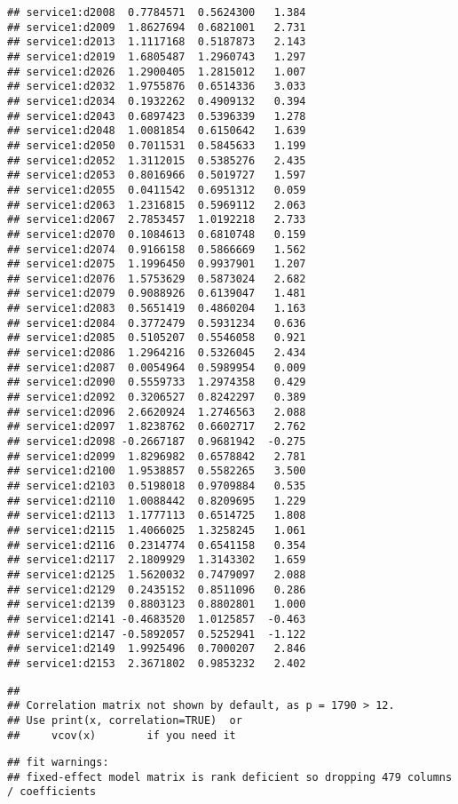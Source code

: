 \documentclass[
]{article}
\begin{document}
\begin{verbatim}
## service1:d2008  0.7784571  0.5624300   1.384
## service1:d2009  1.8627694  0.6821001   2.731
## service1:d2013  1.1117168  0.5187873   2.143
## service1:d2019  1.6805487  1.2960743   1.297
## service1:d2026  1.2900405  1.2815012   1.007
## service1:d2032  1.9755876  0.6514336   3.033
## service1:d2034  0.1932262  0.4909132   0.394
## service1:d2043  0.6897423  0.5396339   1.278
## service1:d2048  1.0081854  0.6150642   1.639
## service1:d2050  0.7011531  0.5845633   1.199
## service1:d2052  1.3112015  0.5385276   2.435
## service1:d2053  0.8016966  0.5019727   1.597
## service1:d2055  0.0411542  0.6951312   0.059
## service1:d2063  1.2316815  0.5969112   2.063
## service1:d2067  2.7853457  1.0192218   2.733
## service1:d2070  0.1084613  0.6810748   0.159
## service1:d2074  0.9166158  0.5866669   1.562
## service1:d2075  1.1996450  0.9937901   1.207
## service1:d2076  1.5753629  0.5873024   2.682
## service1:d2079  0.9088926  0.6139047   1.481
## service1:d2083  0.5651419  0.4860204   1.163
## service1:d2084  0.3772479  0.5931234   0.636
## service1:d2085  0.5105207  0.5546058   0.921
## service1:d2086  1.2964216  0.5326045   2.434
## service1:d2087  0.0054964  0.5989954   0.009
## service1:d2090  0.5559733  1.2974358   0.429
## service1:d2092  0.3206527  0.8242297   0.389
## service1:d2096  2.6620924  1.2746563   2.088
## service1:d2097  1.8238762  0.6602717   2.762
## service1:d2098 -0.2667187  0.9681942  -0.275
## service1:d2099  1.8296982  0.6578842   2.781
## service1:d2100  1.9538857  0.5582265   3.500
## service1:d2103  0.5198018  0.9709884   0.535
## service1:d2110  1.0088442  0.8209695   1.229
## service1:d2113  1.1777113  0.6514725   1.808
## service1:d2115  1.4066025  1.3258245   1.061
## service1:d2116  0.2314774  0.6541158   0.354
## service1:d2117  2.1809929  1.3143302   1.659
## service1:d2125  1.5620032  0.7479097   2.088
## service1:d2129  0.2435152  0.8511096   0.286
## service1:d2139  0.8803123  0.8802801   1.000
## service1:d2141 -0.4683520  1.0125857  -0.463
## service1:d2147 -0.5892057  0.5252941  -1.122
## service1:d2149  1.9925496  0.7000207   2.846
## service1:d2153  2.3671802  0.9853232   2.402
\end{verbatim}

\begin{verbatim}
## 
## Correlation matrix not shown by default, as p = 1790 > 12.
## Use print(x, correlation=TRUE)  or
##     vcov(x)        if you need it
\end{verbatim}

\begin{verbatim}
## fit warnings:
## fixed-effect model matrix is rank deficient so dropping 479 columns / coefficients
\end{verbatim}
\end{document}
